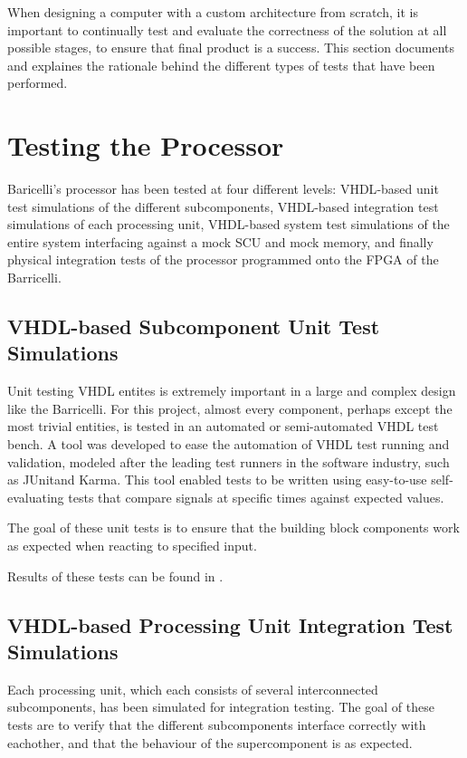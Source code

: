 When designing a computer with a custom architecture from scratch, it is important to continually test and evaluate the correctness of the solution at all possible stages, to ensure that final product is a success.
This section documents and explaines the rationale behind the different types of tests that have been performed.

\section{Testing the Processor}

Baricelli's processor has been tested at four different levels: \gls{VHDL}-based unit test simulations of the different subcomponents,  \gls{VHDL}-based integration test simulations of each processing unit, \gls{VHDL}-based system test simulations of the entire system interfacing against a mock SCU and mock memory, and finally physical integration tests of the processor programmed onto the FPGA of the Barricelli.


\subsection{\gls{VHDL}-based Subcomponent Unit Test Simulations}

Unit testing VHDL entites is extremely important in a large and complex design like the Barricelli.
For this project, almost every component, perhaps except the most trivial entities, is tested in an automated or semi-automated VHDL test bench.
A tool was developed to ease the automation of VHDL test running and validation, modeled after the leading test runners in the software industry, such as JUnit\cn and Karma\cn.
This tool enabled tests to be written using easy-to-use self-evaluating tests that compare signals at specific times against expected values.

The goal of these unit tests is to ensure that the building block components work as expected when reacting to specified input.

Results of these tests can be found in .

\subsection{\gls{VHDL}-based Processing Unit Integration Test Simulations}

Each processing unit, which each consists of several interconnected subcomponents, has been simulated for integration testing.
The goal of these tests are to verify that the different subcomponents interface correctly with eachother, and that the behaviour of the supercomponent is as expected.

